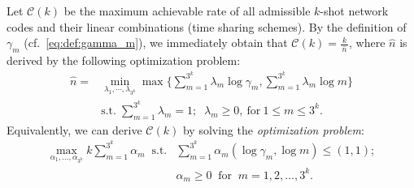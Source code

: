 \documentclass[11pt,draftclsnofoot,onecolumn]{IEEEtran}
\begin{document}
\begin{journalonly}
{Let $\mathcal{C}(k)$ be the maximum achievable rate  of  all admissible $k$-shot network codes and their linear combinations (time sharing schemes). By the definition of $\gamma_{m}$ (cf.~\eqref{eq:def:gamma_m}), we immediately obtain that $\mathcal{C}(k)=\frac{k}{\,\widehat{n}\,}$, where $\widehat{n}$ is derived by the following optimization problem:
 \begin{align}
\widehat{n}=&\min_{\lambda_{1},\cdots,\lambda_{3^{k}}}\max\Bigg\{\sum_{m=1}^{3^{k}}\lambda_{m}\log\gamma_{m},
\sum_{m=1}^{3^{k}}\lambda_{m}\log m\Bigg\}\nonumber\\
&\text{s.t.}\;\sum_{m=1}^{3^{k}}\lambda_{m}=1;\;\;\lambda_{m}\geq 0, ~\text{for}~1\leq m\leq 3^{k}.\label{time-shar-opti-pro-C(k)}
 \end{align}
 Equivalently, we can derive $\mathcal{C}(k)$ by solving the \emph{optimization problem}:
\begin{equation}
	\begin{split}
		\max_{\alpha_{1},\ldots,\alpha_{3^{k}}}k\sum_{m=1}^{3^{k}}\alpha_{m}\;\;
		\text{s.t.}&\sum_{m=1}^{3^{k}}\alpha_{m}(\log\gamma_{m},\log m)\leq (1,1);\\
		&\alpha_{m}\geq 0\;\;\text{for}\;\; m= 1,2,\ldots,3^{k}.
	\end{split}\label{eq:opti_problem_C_k}
\end{equation}

}
\end{journalonly}
\end{document}
